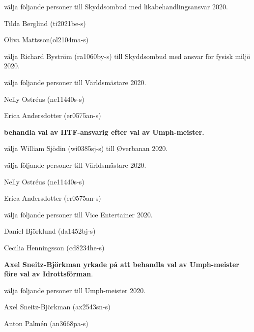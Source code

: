 \documentclass[10pt]{article}
\begin{document}
\begin{paragrafer}
\begin{paralist}
    \Mba välja följande personer till Skyddsombud med likabehandlingsansvar 2020.
    \begin{tightdashlist}
        \item Tilda Berglind (ti2021be-s)
        \item Oliva Mattsson(ol2104ma-s)
    \end{tightdashlist}

    \Mba välja Richard Byström (ra1060by-s) till Skyddsombud med ansvar för fysisk miljö 2020.
    
    \Mba välja följande personer till Världsmästare 2020.
    \begin{tightdashlist}
        \item Nelly Ostréus (ne11440s-s)
        \item Erica Andersdotter (er0575an-s)
    \end{tightdashlist}

    \textbf{\Mba behandla val av HTF-ansvarig efter val av Umph-meister.}

    \Mba välja William Sjödin (wi0385sj-s) till Øverbanan 2020. 

    \Mba välja följande personer till Världsmästare 2020.
    \begin{tightdashlist}
        \item Nelly Ostréus (ne11440s-s)
        \item Erica Andersdotter (er0575an-s)
    \end{tightdashlist}

    \Mba välja följande personer till Vice Entertainer 2020.
    \begin{tightdashlist}
        \item Daniel Björklund (da1452bj-s)
        \item Cecilia Henningsson (cd8234he-s)
    \end{tightdashlist}

    \textbf{Axel Sneitz-Björkman yrkade på att behandla val av Umph-meister före val av Idrottsförman}.

    \textbf{\Mbaby}

    \Mba välja följande personer till Umph-meister 2020.
    \begin{tightdashlist}
        \item Axel Sneitz-Björkman (ax2543sn-s)
        \item Anton Palmén (an3668pa-s)
    \end{tightdashlist}
    

\end{paralist}
\end{paragrafer}
\end{document}
